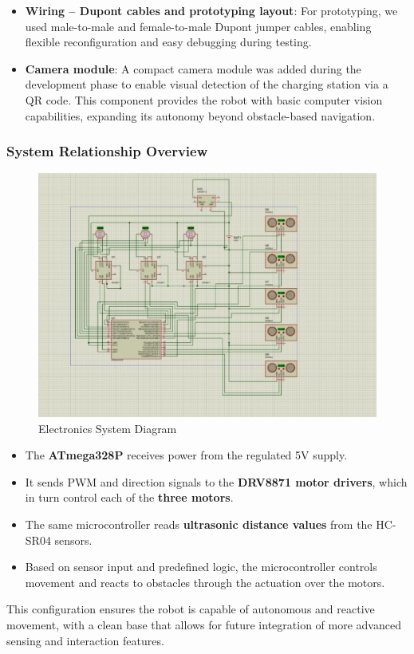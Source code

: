 \begin{itemize}
    \item \textbf{Wiring – Dupont cables and prototyping layout}: For prototyping, we used male-to-male and female-to-male Dupont jumper cables, enabling flexible reconfiguration and easy debugging during testing.
    
    \item \textbf{Camera module}: A compact camera module was added during the development phase to enable visual detection of the charging station via a QR code. This component provides the robot with basic computer vision capabilities, expanding its autonomy beyond obstacle-based navigation.
\end{itemize}

\subsubsection{System Relationship Overview}

\begin{figure}[H]
    \centering
    \includegraphics[width=0.7\linewidth]{../ReportMovementModule/images/Aspose.Words.728084da-df58-4b9d-a372-f65cffbdb23d.030.jpeg}
    \caption{Electronics System Diagram}
\end{figure}

\begin{itemize}
    \item The \textbf{ATmega328P} receives power from the regulated 5V supply.
    \item It sends PWM and direction signals to the \textbf{DRV8871 motor drivers}, which in turn control each of the \textbf{three motors}.
    \item The same microcontroller reads \textbf{ultrasonic distance values} from the HC-SR04 sensors.
    \item Based on sensor input and predefined logic, the microcontroller controls movement and reacts to obstacles through the actuation over the motors.
\end{itemize}

This configuration ensures the robot is capable of autonomous and reactive movement, with a clean base that allows for future integration of more advanced sensing and interaction features.
